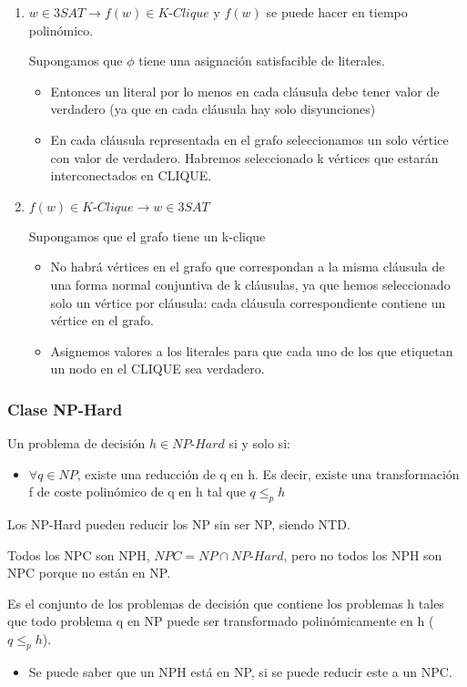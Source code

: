 \begin{enumerate}
	\item $w\in \textit{3SAT} \rightarrow f(w)\in \textit{K-Clique}$ y $f(w)$ se puede hacer en tiempo polinómico.

	      Supongamos que $\phi$ tiene una asignación satisfacible de literales.
	      \begin{itemize}
		      \item Entonces un literal por lo menos en cada cláusula debe tener valor de verdadero (ya que en cada cláusula hay solo disyunciones)
		      \item En cada cláusula representada en el grafo seleccionamos un solo vértice con valor de verdadero. Habremos seleccionado k vértices que estarán interconectados en CLIQUE.
	      \end{itemize}
	\item $f(w)\in \textit{K-Clique} \rightarrow w \in \textit{3SAT}$

	      Supongamos que el grafo tiene un k-clique
	      \begin{itemize}
		      \item No habrá vértices en el grafo que correspondan a la misma cláusula de una forma normal conjuntiva de k cláusulas, ya que hemos seleccionado solo un vértice por cláusula: cada cláusula correspondiente contiene un vértice en el grafo.
		      \item Asignemos valores a los literales para que cada uno de los que etiquetan un nodo en el CLIQUE sea verdadero.
	      \end{itemize}
\end{enumerate}
\pagebreak

\subsubsection{Clase NP-Hard}
Un problema de decisión $h \in \textit{NP-Hard}$ si y solo si:
\begin{itemize}
	\item $\forall q \in NP$, existe una reducción de q en h. Es decir, existe una transformación f de coste polinómico de q en h tal que $q \leq_p h$
\end{itemize}

Los NP-Hard pueden reducir los NP sin ser NP, siendo NTD.

Todos los NPC son NPH, $\textit{NPC}=\textit{NP} \cap \textit{NP-Hard}$, pero no todos los NPH son NPC porque no están en NP.

Es el conjunto de los problemas de decisión que contiene los problemas h tales que todo problema q en NP puede ser transformado polinómicamente en h ($q \leq_p h$).
\begin{itemize}
	\item Se puede saber que un NPH está en NP, si se puede reducir este a un NPC.
\end{itemize}

